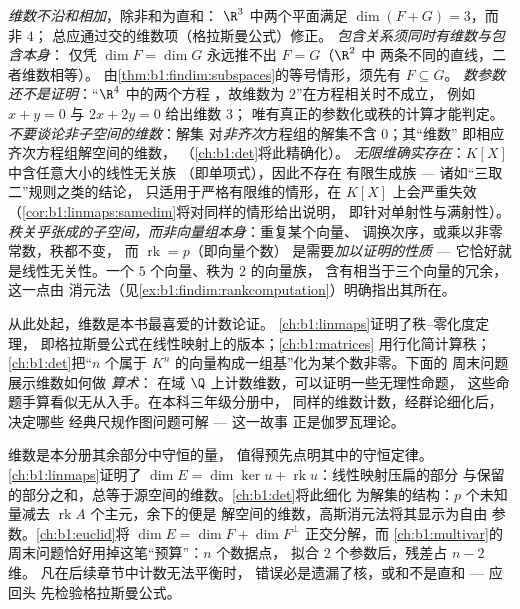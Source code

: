 \begin{remark}[常见误区]
\label{rem:b1:findim:pitfalls}
\emph{维数不沿和相加}，除非和为直和：
$\R^3$ 中两个平面满足 $\dim(F + G) = 3$，而非 $4$；
总应通过交的维数项（格拉斯曼公式）修正。
\emph{包含关系须同时有维数\emph{与}包含本身}：
仅凭 $\dim F = \dim G$ 永远推不出 $F = G$（$\R^2$ 中
两条不同的直线，二者维数相等）。
由\cref{thm:b1:findim:subspaces}的等号情形，须先有 $F \subseteq G$。
\emph{数参数还不是证明}：“$\R^4$ 中的两个方程
，故维数为 $2$”在方程相关时不成立，
例如 $x + y = 0$ 与 $2x + 2y = 0$ 给出维数 $3$；
唯有真正的参数化或秩的计算才能判定。
\emph{不要谈论非子空间的维数}：解集
对\emph{非齐次}方程组的解集不含 $0$；其“维数”
即相应齐次方程组解空间的维数，
（\cref{ch:b1:det}将此精确化）。
\emph{无限维确实存在}：$K[X]$ 中含任意大小的线性无关族
（即单项式），因此不存在
有限生成族 --- 诸如“三取二”规则之类的结论，
只适用于严格有限维的情形，在 $K[X]$ 上会严重失效
（\cref{cor:b1:linmaps:samedim}将对同样的情形给出说明，
即针对单射性与满射性）。
\emph{秩关乎张成的子空间，而非向量组本身}：重复某个向量、
调换次序，或乘以非零常数，秩都不变，
而 $\operatorname{rk} = p$（即向量个数）
是需要\emph{加以证明的性质} --- 它恰好就是线性无关性。一个
$5$ 个向量、秩为 $2$ 的向量族，
含有相当于三个向量的冗余，这一点由
消元法（见\cref{ex:b1:findim:rankcomputation}）明确指出其所在。
\end{remark}

\begin{remark}[维数的用武之地]
\label{rem:b1:findim:whereused}
从此处起，维数是本书最喜爱的计数论证。
\cref{ch:b1:linmaps}证明了秩--零化度定理，
即格拉斯曼公式在线性映射上的版本；\cref{ch:b1:matrices}
用行化简计算秩；\cref{ch:b1:det}把“$n$
个属于 $K^n$ 的向量构成一组基”化为某个数非零。下面的
周末问题展示维数如何做 \emph{算术}：
在域 $\Q$ 上计数维数，可以证明一些无理性命题，
这些命题手算看似无从入手。在本科三年级分册中，
同样的维数计数，经群论细化后，决定哪些
经典尺规作图问题可解 --- 这一故事
正是伽罗瓦理论。
\end{remark}

\begin{remark}[第 3 册内的展望]
\label{rem:b1:findim:perspectives}
维数是本分册其余部分中守恒的量，
值得预先点明其中的守恒定律。
\cref{ch:b1:linmaps}证明了 $\dim E = \dim\ker u +
\operatorname{rk} u$：线性映射压扁的部分
与保留的部分之和，总等于源空间的维数。\cref{ch:b1:det}将此细化
为解集的结构：$p$ 个未知量减去
$\operatorname{rk} A$ 个主元，余下的便是
解空间的维数，高斯消元法将其显示为自由
参数。\cref{ch:b1:euclid}将 $\dim E = \dim F + \dim
F^\perp$ 正交分解，而
\cref{ch:b1:multivar}的周末问题恰好用掉这笔“预算”：$n$ 个数据点，
拟合 $2$ 个参数后，残差占 $n - 2$ 维。
凡在后续章节中计数无法平衡时，
错误必是遗漏了核，或和不是直和 --- 应回头
先检验格拉斯曼公式。
\end{remark}

